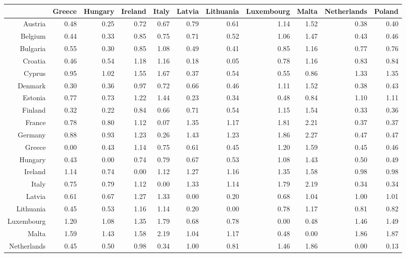 \documentclass[a4paper,twoside,10pt]{article}
\begin{document}
	\begin{table}[ht]
		\footnotesize
		\centering
		\tabcolsep=0.11cm
		\begin{tabular}{r|rrrrrrrrrr}
			\hline
			& Greece & Hungary & Ireland & Italy & Latvia & Lithuania & Luxembourg & Malta & Netherlands & Poland \\
			\hline
			Austria & 0.48 & 0.25 & 0.72 & 0.67 & 0.79 & 0.61 & 1.14 & 1.52 & 0.38 & 0.40 \\
			Belgium & 0.44 & 0.33 & 0.85 & 0.75 & 0.71 & 0.52 & 1.06 & 1.47 & 0.43 & 0.46 \\
			Bulgaria & 0.55 & 0.30 & 0.85 & 1.08 & 0.49 & 0.41 & 0.85 & 1.16 & 0.77 & 0.76 \\
			Croatia & 0.46 & 0.54 & 1.18 & 1.16 & 0.18 & 0.05 & 0.78 & 1.16 & 0.83 & 0.84 \\
			Cyprus & 0.95 & 1.02 & 1.55 & 1.67 & 0.37 & 0.54 & 0.55 & 0.86 & 1.33 & 1.35 \\
			Denmark & 0.30 & 0.36 & 0.97 & 0.72 & 0.66 & 0.46 & 1.11 & 1.52 & 0.38 & 0.43 \\
			Estonia & 0.77 & 0.73 & 1.22 & 1.44 & 0.23 & 0.34 & 0.48 & 0.84 & 1.10 & 1.11 \\
			Finland & 0.32 & 0.22 & 0.84 & 0.66 & 0.71 & 0.54 & 1.15 & 1.54 & 0.33 & 0.36 \\
			France & 0.78 & 0.80 & 1.12 & 0.07 & 1.35 & 1.17 & 1.81 & 2.21 & 0.37 & 0.37 \\
			Germany & 0.88 & 0.93 & 1.23 & 0.26 & 1.43 & 1.23 & 1.86 & 2.27 & 0.47 & 0.47 \\
			Greece & 0.00 & 0.43 & 1.14 & 0.75 & 0.61 & 0.45 & 1.20 & 1.59 & 0.45 & 0.46 \\
			Hungary & 0.43 & 0.00 & 0.74 & 0.79 & 0.67 & 0.53 & 1.08 & 1.43 & 0.50 & 0.49 \\
			Ireland & 1.14 & 0.74 & 0.00 & 1.12 & 1.27 & 1.16 & 1.35 & 1.58 & 0.98 & 0.98 \\
			Italy & 0.75 & 0.79 & 1.12 & 0.00 & 1.33 & 1.14 & 1.79 & 2.19 & 0.34 & 0.34 \\
			Latvia & 0.61 & 0.67 & 1.27 & 1.33 & 0.00 & 0.20 & 0.68 & 1.04 & 1.00 & 1.01 \\
			Lithuania & 0.45 & 0.53 & 1.16 & 1.14 & 0.20 & 0.00 & 0.78 & 1.17 & 0.81 & 0.82 \\
			Luxembourg & 1.20 & 1.08 & 1.35 & 1.79 & 0.68 & 0.78 & 0.00 & 0.48 & 1.46 & 1.49 \\
			Malta & 1.59 & 1.43 & 1.58 & 2.19 & 1.04 & 1.17 & 0.48 & 0.00 & 1.86 & 1.87 \\
			Netherlands & 0.45 & 0.50 & 0.98 & 0.34 & 1.00 & 0.81 & 1.46 & 1.86 & 0.00 & 0.13 \\

\end{tabular}
\end{table}
\end{document}

